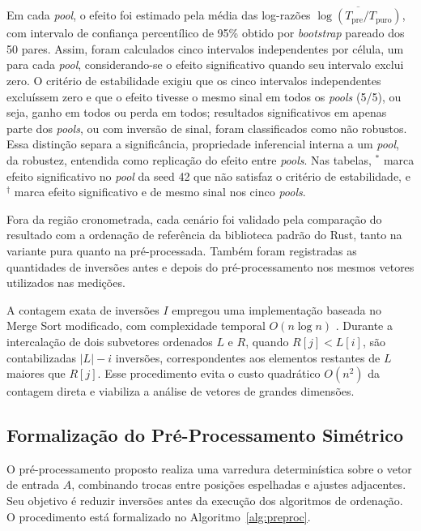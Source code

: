 \documentclass[12pt]{article}
\begin{document}
Em cada \emph{pool}, o efeito foi estimado pela média das log-razões $\overline{\log(T_{\text{pre}}/T_{\text{puro}})}$, com intervalo de confiança percentílico de 95\% obtido por \emph{bootstrap} pareado dos 50 pares. Assim, foram calculados cinco intervalos independentes por célula, um para cada \emph{pool}, considerando-se o efeito significativo quando seu intervalo exclui zero. O critério de estabilidade exigiu que os cinco intervalos independentes excluíssem zero e que o efeito tivesse o mesmo sinal em todos os \emph{pools} (5/5), ou seja, ganho em todos ou perda em todos; resultados significativos em apenas parte dos \emph{pools}, ou com inversão de sinal, foram classificados como não robustos. Essa distinção separa a significância, propriedade inferencial interna a um \emph{pool}, da robustez, entendida como replicação do efeito entre \emph{pools}. Nas tabelas, $^{*}$ marca efeito significativo no \emph{pool} da seed 42 que não satisfaz o critério de estabilidade, e $^{\dagger}$ marca efeito significativo e de mesmo sinal nos cinco \emph{pools}.

Fora da região cronometrada, cada cenário foi validado pela comparação do resultado com a ordenação de referência da biblioteca padrão do Rust, tanto na variante pura quanto na pré-processada. Também foram registradas as quantidades de inversões antes e depois do pré-processamento nos mesmos vetores utilizados nas medições.

A contagem exata de inversões $I$ empregou uma implementação baseada no Merge Sort modificado, com complexidade temporal $O(n\log n)$ \cite{cormen_introduction_2022}. Durante a intercalação de dois subvetores ordenados $L$ e $R$, quando $R[j]<L[i]$, são contabilizadas $|L|-i$ inversões, correspondentes aos elementos restantes de $L$ maiores que $R[j]$. Esse procedimento evita o custo quadrático $O(n^2)$ da contagem direta e viabiliza a análise de vetores de grandes dimensões.

\subsection{Formalização do Pré-Processamento Simétrico}\label{sec:formal}

O pré-processamento proposto realiza uma varredura determinística sobre o vetor de entrada $A$, combinando trocas entre posições espelhadas e ajustes adjacentes. Seu objetivo é reduzir inversões antes da execução dos algoritmos de ordenação. O procedimento está formalizado no Algoritmo~\ref{alg:preproc}.
\end{document}
